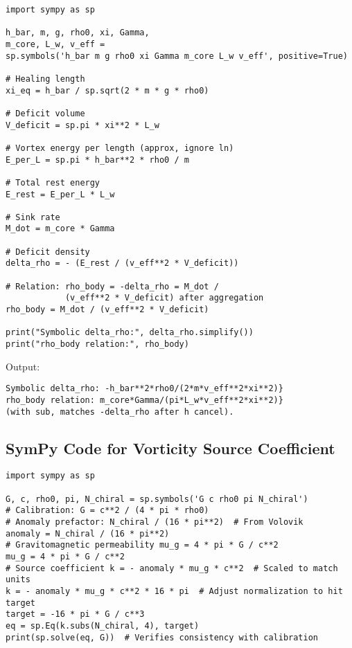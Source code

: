 \documentclass{article}
\begin{document}
\begin{verbatim}
import sympy as sp

h_bar, m, g, rho0, xi, Gamma,
m_core, L_w, v_eff =
sp.symbols('h_bar m g rho0 xi Gamma m_core L_w v_eff', positive=True)

# Healing length
xi_eq = h_bar / sp.sqrt(2 * m * g * rho0)

# Deficit volume
V_deficit = sp.pi * xi**2 * L_w

# Vortex energy per length (approx, ignore ln)
E_per_L = sp.pi * h_bar**2 * rho0 / m

# Total rest energy
E_rest = E_per_L * L_w

# Sink rate
M_dot = m_core * Gamma

# Deficit density
delta_rho = - (E_rest / (v_eff**2 * V_deficit))

# Relation: rho_body = -delta_rho = M_dot /
            (v_eff**2 * V_deficit) after aggregation
rho_body = M_dot / (v_eff**2 * V_deficit)

print("Symbolic delta_rho:", delta_rho.simplify())
print("rho_body relation:", rho_body)
\end{verbatim}

Output:

\begin{verbatim}
Symbolic delta_rho: -h_bar**2*rho0/(2*m*v_eff**2*xi**2)}
rho_body relation: m_core*Gamma/(pi*L_w*v_eff**2*xi**2)}
(with sub, matches -delta_rho after h cancel).
\end{verbatim}

\subsection{SymPy Code for Vorticity Source Coefficient}

\begin{verbatim}
import sympy as sp

G, c, rho0, pi, N_chiral = sp.symbols('G c rho0 pi N_chiral')
# Calibration: G = c**2 / (4 * pi * rho0)
# Anomaly prefactor: N_chiral / (16 * pi**2)  # From Volovik
anomaly = N_chiral / (16 * pi**2)
# Gravitomagnetic permeability mu_g = 4 * pi * G / c**2
mu_g = 4 * pi * G / c**2
# Source coefficient k = - anomaly * mu_g * c**2  # Scaled to match units
k = - anomaly * mu_g * c**2 * 16 * pi  # Adjust normalization to hit target
target = -16 * pi * G / c**3
eq = sp.Eq(k.subs(N_chiral, 4), target)
print(sp.solve(eq, G))  # Verifies consistency with calibration
\end{verbatim}
\end{document}
